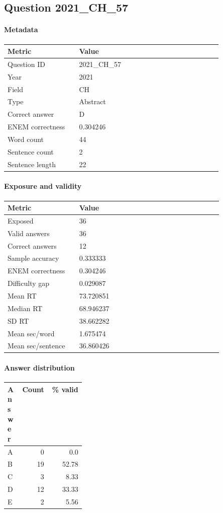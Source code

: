 \subsection*{Question 2021\_CH\_57}
\label{sec:q_2021_CH_57}
\paragraph{Metadata}
\begin{tabular}{p{0.30\linewidth}p{0.60\linewidth}}
\toprule
Metric & Value\\
\midrule
Question ID & 2021\_CH\_57\\
Year & 2021\\
Field & CH\\
Type & Abstract\\
Correct answer & D\\
ENEM correctness & 0.304246\\
Word count & 44\\
Sentence count & 2\\
Sentence length & 22\\
\bottomrule
\end{tabular}

\paragraph{Exposure and validity}
\begin{tabular}{p{0.30\linewidth}p{0.60\linewidth}}
\toprule
Metric & Value\\
\midrule
Exposed & 36\\
Valid answers & 36\\
Correct answers & 12\\
Sample accuracy & 0.333333\\
ENEM correctness & 0.304246\\
Difficulty gap & 0.029087\\
Mean RT & 73.720851\\
Median RT & 68.946237\\
SD RT & 38.662282\\
Mean sec/word & 1.675474\\
Mean sec/sentence & 36.860426\\
\bottomrule
\end{tabular}

\paragraph{Answer distribution}
\begin{tabular}{p{0.18\linewidth}rr}
\toprule
Answer & Count & \% valid\\
\midrule
A & 0 & 0.0\\
B & 19 & 52.78\\
C & 3 & 8.33\\
D & 12 & 33.33\\
E & 2 & 5.56\\
\bottomrule
\end{tabular}

